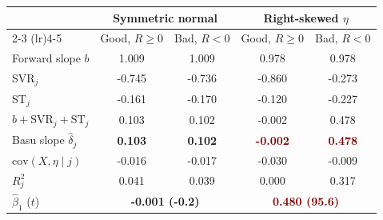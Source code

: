 \begin{tabular}{@{}lcccc@{}}
\toprule
 & \multicolumn{2}{c}{Symmetric normal} & \multicolumn{2}{c}{Right-skewed $\eta$} \\
\cmidrule(lr){2-3} \cmidrule(lr){4-5}
 & Good, $R \ge 0$ & Bad, $R < 0$ & Good, $R \ge 0$ & Bad, $R < 0$ \\
\midrule
Forward slope $b$ & 1.009 & 1.009 & 0.978 & 0.978 \\
SVR$_j$ & -0.745 & -0.736 & -0.860 & -0.273 \\
ST$_j$ & -0.161 & -0.170 & -0.120 & -0.227 \\
$b + \mathrm{SVR}_j + \mathrm{ST}_j$ & 0.103 & 0.102 & -0.002 & 0.478 \\
Basu slope $\hat\delta_j$ & \textcolor{DeepNavy}{\bfseries 0.103} & \textcolor{DeepNavy}{\bfseries 0.102} & \textcolor{Maroon}{\bfseries -0.002} & \textcolor{Maroon}{\bfseries 0.478} \\
\midrule
$\mathrm{cov}(X, \eta \mid j)$ & -0.016 & -0.017 & -0.030 & -0.009 \\
$R^2_j$ & 0.041 & 0.039 & 0.000 & 0.317 \\
\midrule
$\hat\beta_1$ ($t$) & \multicolumn{2}{c}{\textcolor{DeepNavy}{\bfseries -0.001 (-0.2)}} & \multicolumn{2}{c}{\textcolor{Maroon}{\bfseries 0.480 (95.6)}} \\
\bottomrule
\end{tabular}
